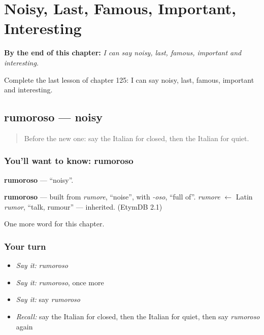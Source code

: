 
\chapter{Noisy, Last, Famous, Important, Interesting}
\label{ch:it-noisy-last-famous-important-interesting}

\begin{chapteropening}
\textbf{By the end of this chapter:} \emph{I can say noisy, last, famous, important and interesting.}

Complete the last lesson of chapter 125: I can say noisy, last, famous, important and interesting.
\end{chapteropening}

\section[rumoroso]{rumoroso — noisy}

\label{lesson:IT-C125-rumoroso}



\begin{quote}
Before the new one: say the Italian for closed, then the Italian for quiet.
\end{quote}

\subsection*{You'll want to know: rumoroso}
\textbf{rumoroso} — \textquotedblleft{}noisy\textquotedblright{}.

\begin{cousinweb}
\textbf{rumoroso} — built from \emph{rumore}, \textquotedblleft{}noise\textquotedblright{}, with \emph{-oso}, \textquotedblleft{}full of\textquotedblright{}. \emph{rumore} $\leftarrow$ Latin \emph{rumor}, \textquotedblleft{}talk, rumour\textquotedblright{} — inherited. (EtymDB 2.1)
\end{cousinweb}

\begin{grammarlens}[title={What you've built}]
One more word for this chapter.
\end{grammarlens}

\subsection*{Your turn}
\begin{itemize}
\raggedright
  \item \emph{Say it:} \emph{rumoroso}
  \item \emph{Say it:} \emph{rumoroso}, once more
  \item \emph{Say it:} say \emph{rumoroso}
  \item \emph{Recall:} say the Italian for closed, then the Italian for quiet, then say \emph{rumoroso} again
\end{itemize}

